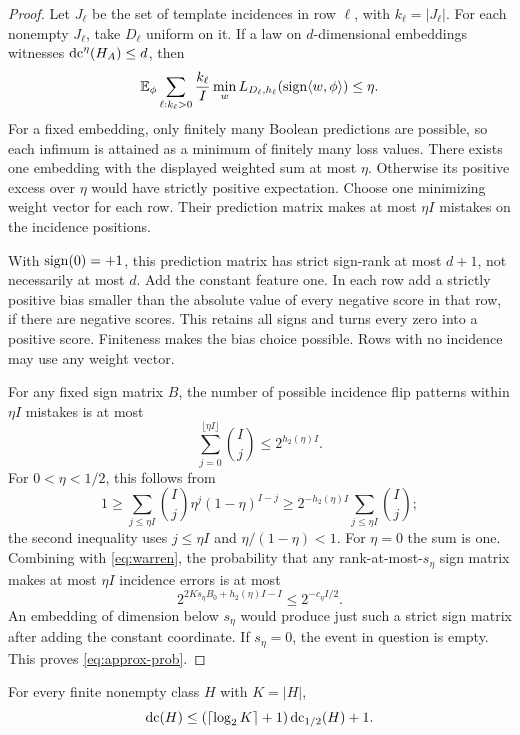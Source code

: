 \begin{proof}
Let $J_\ell$ be the set of template incidences in row $\ell$, with $k_\ell=|J_\ell|$. For each nonempty $J_\ell$, take $D_\ell$ uniform on it. If a law on $d$-dimensional embeddings witnesses $\operatorname{dc}^\eta(H_A)\le d$, then
\[
 \mathbb E_\phi\sum_{\ell:k_\ell>0}\frac{k_\ell}{I}
       \min_w L_{D_\ell,h_\ell}(\operatorname{sign}\langle w,\phi\rangle)\le\eta.
\]
For a fixed embedding, only finitely many Boolean predictions are possible, so each infimum is attained as a minimum of finitely many loss values. There exists one embedding with the displayed weighted sum at most $\eta$. Otherwise its positive excess over $\eta$ would have strictly positive expectation. Choose one minimizing weight vector for each row. Their prediction matrix makes at most $\eta I$ mistakes on the incidence positions.

With $\operatorname{sign}(0)=+1$, this prediction matrix has strict sign-rank at most $d+1$, not necessarily at most $d$. Add the constant feature one. In each row add a strictly positive bias smaller than the absolute value of every negative score in that row, if there are negative scores. This retains all signs and turns every zero into a positive score. Finiteness makes the bias choice possible. Rows with no incidence may use any weight vector.

For any fixed sign matrix $B$, the number of possible incidence flip patterns within $\eta I$ mistakes is at most
\[
 \sum_{j=0}^{\lfloor\eta I\rfloor}\binom Ij\le2^{h_2(\eta)I}.
\]
For $0<\eta<1/2$, this follows from
\[
 1\ge\sum_{j\le\eta I}\binom Ij\eta^j(1-\eta)^{I-j}
 \ge2^{-h_2(\eta)I}\sum_{j\le\eta I}\binom Ij;
\]
the second inequality uses $j\le\eta I$ and $\eta/(1-\eta)<1$. For $\eta=0$ the sum is one. Combining with \eqref{eq:warren}, the probability that any rank-at-most-$s_\eta$ sign matrix makes at most $\eta I$ incidence errors is at most
\[
 2^{2Ks_\eta B_0+h_2(\eta)I-I}\le2^{-c_\eta I/2}.
\]
An embedding of dimension below $s_\eta$ would produce just such a strict sign matrix after adding the constant coordinate. If $s_\eta=0$, the event in question is empty. This proves \eqref{eq:approx-prob}.

\end{proof}
\begin{lemma}\label{lem:exact-prob}
For every finite nonempty class $H$ with $K=|H|$,
\begin{equation}\label{eq:exact-prob}
 \operatorname{dc}(H)\le(\lceil\log_2K\rceil+1)\operatorname{dc}_{1/2}(H)+1.
\end{equation}
\end{lemma}
